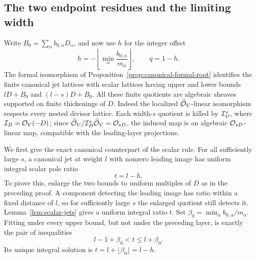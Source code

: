 \subsection{The two endpoint residues and the limiting width}

Write $B_0=\sum_\alpha b_{0,\alpha}D_\alpha$, and now use
$h$ for the integer offset
\begin{equation}\label{eq:canonical-offset}
 h=-\left\lfloor\min_\alpha
                   \frac{b_{0,\alpha}}{m_\alpha}\right\rfloor,
 \qquad q=1-h.
\end{equation}
The formal isomorphism of
Proposition~\ref{prop:canonical-formal-root} identifies the
finite canonical jet lattices with scalar lattices having
upper and lower bounds $lD+B_0$ and $(l-s)D+B_0$.
All these finite quotients are algebraic sheaves supported
on finite thickenings of $D$.
Indeed the localized $\widehat{\mathcal O}_V$-linear isomorphism
respects every nested divisor lattice. Each width-$s$
quotient is killed by $\mathcal I_D^s$, where $\mathcal I_D=\mathcal O_V(-D)$;
since $\widehat{\mathcal O}_V/\mathcal I_D^s\widehat{\mathcal O}_V=\mathcal O_{sD}$,
the induced map is an algebraic $\mathcal O_{sD}$-linear map,
compatible with the leading-layer projections.

We first give the exact canonical counterpart of the scalar
rule. For all sufficiently large $s$, a canonical jet at
weight $l$ with nonzero leading image has uniform integral
scalar pole ratio
\begin{equation}\label{eq:canonical-scalar-ratio}
 t=l-h.
\end{equation}
To prove this, enlarge the two bounds to uniform multiples
of $D$ as in the preceding proof. A component detecting the
leading image has ratio within a fixed distance of $l$, so
for sufficiently large $s$ the enlarged quotient still
detects it. Lemma~\ref{lem:scalar-jets} gives a uniform
integral ratio $t$. Set
$\beta_0=\min_\alpha b_{0,\alpha}/m_\alpha$. Fitting
under every upper bound, but not under the preceding layer,
is exactly the pair of inequalities
\[
 l-1+\beta_0<t\leq l+\beta_0.
\]
Its unique integral solution is
$t=l+\lfloor\beta_0\rfloor=l-h$.

